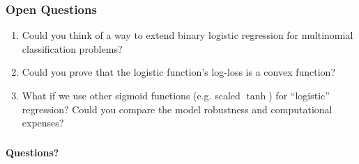 \documentclass[10pt,aspectratio=169]{beamer}
\begin{document}
      \begin{frame}
        \frametitle{Open Questions}

        \begin{enumerate}
        \item Could you think of a way to extend binary logistic
          regression for multinomial classification problems?

          
        \item Could you prove that the logistic function's log-loss is
          a convex function?

          
        \item What if we use other sigmoid functions (e.g. scaled
          $\tanh$) for ``logistic'' regression? Could you compare the
          model robustness and computational expenses?
        
        \end{enumerate}
        
      \end{frame}

      \begin{frame}[c]
        \frametitle{}
        \centering \vspace{3em} {\Huge \bfseries Questions?}
      \end{frame}
\end{document}
